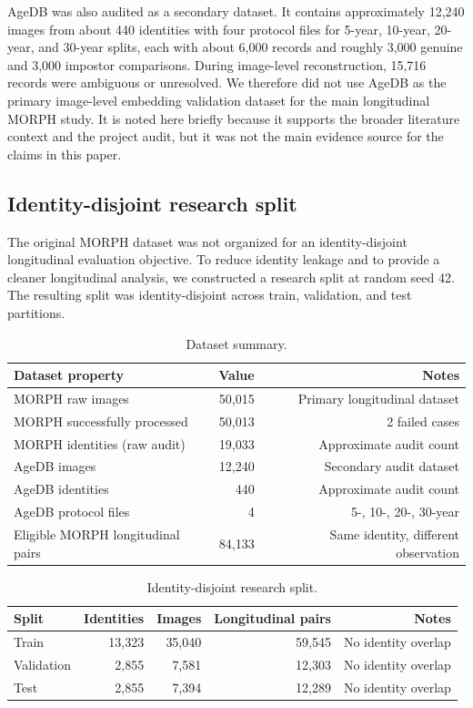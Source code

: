 \documentclass[conference]{IEEEtran}
\begin{document}
AgeDB was also audited as a secondary dataset. It contains approximately 12,240 images from about 440 identities with four protocol files for 5-year, 10-year, 20-year, and 30-year splits, each with about 6,000 records and roughly 3,000 genuine and 3,000 impostor comparisons. During image-level reconstruction, 15,716 records were ambiguous or unresolved. We therefore did not use AgeDB as the primary image-level embedding validation dataset for the main longitudinal MORPH study. It is noted here briefly because it supports the broader literature context and the project audit, but it was not the main evidence source for the claims in this paper.

\subsection{Identity-disjoint research split}
The original MORPH dataset was not organized for an identity-disjoint longitudinal evaluation objective. To reduce identity leakage and to provide a cleaner longitudinal analysis, we constructed a research split at random seed 42. The resulting split was identity-disjoint across train, validation, and test partitions.

\begin{table}[t]
\centering
\caption{Dataset summary.}
\label{tab:dataset}
\begin{tabular}{@{}lrr@{}}
\toprule
Dataset property & Value & Notes \\
\midrule
MORPH raw images & 50,015 & Primary longitudinal dataset \\
MORPH successfully processed & 50,013 & 2 failed cases \\
MORPH identities (raw audit) & 19,033 & Approximate audit count \\
AgeDB images & 12,240 & Secondary audit dataset \\
AgeDB identities & 440 & Approximate audit count \\
AgeDB protocol files & 4 & 5-, 10-, 20-, 30-year \\
Eligible MORPH longitudinal pairs & 84,133 & Same identity, different observation \\
\bottomrule
\end{tabular}
\end{table}

\begin{table}[t]
\centering
\caption{Identity-disjoint research split.}
\label{tab:split}
\begin{tabular}{@{}lrrrr@{}}
\toprule
Split & Identities & Images & Longitudinal pairs & Notes \\
\midrule
Train & 13,323 & 35,040 & 59,545 & No identity overlap \\
Validation & 2,855 & 7,581 & 12,303 & No identity overlap \\
Test & 2,855 & 7,394 & 12,289 & No identity overlap \\
\bottomrule
\end{tabular}
\end{table}
\end{document}
